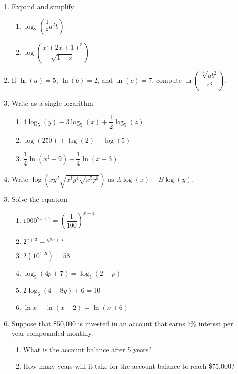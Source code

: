 \documentclass[12pt]{article}
\begin{document}
\begin{enumerate}
	\newpage
	\item Expand and simplify
		\begin{enumerate}
			\item $\log_2\left(\dfrac{1}{8}a^2b\right)$\vfill
			\item $\log\left(\dfrac{x^2(2x+1)^5}{\sqrt{1-x}}\right)$\vfill
		\end{enumerate}
	\item If $\ln(a)=5$, $\ln(b)=2$, and $\ln(c)=7$, compute $\ln\left(\dfrac{\sqrt[3]{ab^2}}{c^3}\right)$.
		\vfill
	\newpage
	\item Write as a single logarithm
		\begin{enumerate}
			\item $4\log_5(y)-3\log_5(x)+\dfrac{1}{2}\log_5(z)$\vfill
			\item $\log(250)+\log(2)-\log(5)$\vfill
			\item $\dfrac{1}{4}\ln(x^2-9)-\dfrac{1}{4}\ln(x-3)$\vfill
		\end{enumerate}
	\item Write $\log\left(xy^2\sqrt{x^3y^4\sqrt{x^5y^6}}\right)$ as $A\log(x)+B\log(y)$.
		\vfill
	
	
	
	\newpage
	\item Solve the equation
		\begin{enumerate}
			\item $1000^{2x+1}=\left(\dfrac{1}{100}\right)^{x-4}$\vfill
			\item $2^{c+3}=7^{2c+5}$\vfill
			\item $2(10^{1.2t})=58$\vfill
			\item $\log_5(4p+7)=\log_5(2-p)$\vfill
			\item $2\log_6(4-8y)+6=10$\vfill
			\item $\ln x+\ln(x+2)=\ln(x+6)$\vfill
		\end{enumerate}
	\newpage
	\item Suppose that \$50,000 is invested in an account that earns $7\%$ interest per year compounded monthly.
		\begin{enumerate}
			\item What is the account balance after 5 years?\vfill
			\item How many years will it take for the account balance to reach \$75,000?\vfill
		\end{enumerate}
	

\end{enumerate}
\end{document}
